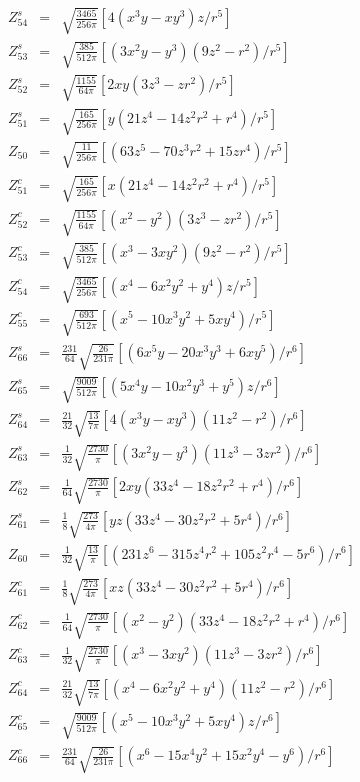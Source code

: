 \documentclass[twoside]{article}
\def\lthtmlcheckvsize{\ifdim\ht\sizebox<\vsize 
  \ifdim\wd\sizebox<\hsize\expandafter\hfill\fi \expandafter\vfill
  \else\expandafter\vss\fi}%
\begin{document}
{\begin{eqnarray*}
Z^s_{54}&=&\sqrt{\frac{3465}{256\pi}}[4(x^3y-xy^3)z/r^5] \\
Z^s_{53}&=&\sqrt{\frac{385}{512\pi}}[(3x^2y-y^3)(9z^2-r^2)/r^5] \\
Z^s_{52}&=&\sqrt{\frac{1155}{64\pi}}[2xy(3z^3-zr^2)/r^5] \\
Z^s_{51}&=&\sqrt{\frac{165}{256\pi}}[y(21z^4-14z^2r^2+r^4)/r^5] \\
Z_{50}&=&\sqrt{\frac{11}{256\pi}}[(63z^5-70z^3r^2+15zr^4)/r^5] \\
Z^c_{51}&=&\sqrt{\frac{165}{256\pi}}[x(21z^4-14z^2r^2+r^4)/r^5] \\
Z^c_{52}&=&\sqrt{\frac{1155}{64\pi}}[(x^2-y^2)(3z^3-zr^2)/r^5] \\
Z^c_{53}&=&\sqrt{\frac{385}{512\pi}}[(x^3-3xy^2)(9z^2-r^2)/r^5] \\
Z^c_{54}&=&\sqrt{\frac{3465}{256\pi}}[(x^4-6x^2y^2+y^4)z/r^5] \\
Z^c_{55}&=&\sqrt{\frac{693}{512\pi}}[(x^5-10x^3y^2+5xy^4)/r^5] \\
\hline
Z^s_{66}&=&\frac{231}{64}\sqrt{\frac{26}{231\pi}}[(6x^5y-20x^3y^3+6xy^5)/r^6] \\
Z^s_{65}&=&\sqrt{\frac{9009}{512\pi}}[(5x^4y-10x^2y^3+y^5)z/r^6] \\
Z^s_{64}&=&\frac{21}{32}\sqrt{\frac{13}{7\pi}}[4(x^3y-xy^3)(11z^2-r^2)/r^6] \\
Z^s_{63}&=&\frac{1}{32}\sqrt{\frac{2730}{\pi}}[(3x^2y-y^3)(11z^3-3zr^2)/r^6] \\
Z^s_{62}&=&\frac{1}{64}\sqrt{\frac{2730}{\pi}}[2xy(33z^4-18z^2r^2+r^4)/r^6] \\
Z^s_{61}&=&\frac{1}{8}\sqrt{\frac{273}{4\pi}}[yz(33z^4-30z^2r^2+5r^4)/r^6] \\
Z_{60}&=&\frac{1}{32}\sqrt{\frac{13}{\pi}}[(231z^6-315z^4r^2+105z^2r^4-5r^6)/r^6] \\
Z^c_{61}&=&\frac{1}{8}\sqrt{\frac{273}{4\pi}}[xz(33z^4-30z^2r^2+5r^4)/r^6] \\
Z^c_{62}&=&\frac{1}{64}\sqrt{\frac{2730}{\pi}}[(x^2-y^2)(33z^4-18z^2r^2+r^4)/r^6] \\
Z^c_{63}&=&\frac{1}{32}\sqrt{\frac{2730}{\pi}}[(x^3-3xy^2)(11z^3-3zr^2)/r^6] \\
Z^c_{64}&=&\frac{21}{32}\sqrt{\frac{13}{7\pi}}[(x^4-6x^2y^2+y^4)(11z^2-r^2)/r^6] \\
Z^c_{65}&=&\sqrt{\frac{9009}{512\pi}}[(x^5-10x^3y^2+5xy^4)z/r^6] \\
Z^c_{66}&=&\frac{231}{64}\sqrt{\frac{26}{231\pi}}[(x^6-15x^4y^2+15x^2y^4-y^6)/r^6] 
\end{eqnarray*}%
\lthtmldisplayZ
\lthtmlcheckvsize\clearpage}
\end{document}
